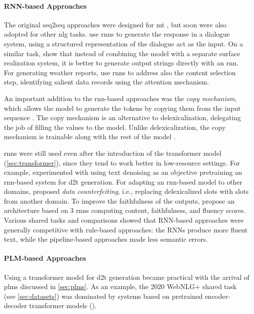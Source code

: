 {\paragraph{RNN-based Approaches} The original seq2seq approaches were designed for \ac{mt} \cite{cho2014learning,sutskever2014sequence}, but soon were also adopted for other \ac{nlg} tasks. \citet{wen2015semantically} use \acp{rnn} to generate the response in a dialogue system, using a structured representation of the dialogue act as the input. On a similar task, \citet{dusekSequencetoSequenceGenerationSpoken2016} show that instead of combining the model with a separate surface realization system, it is better to generate output strings directly with an \ac{rnn}. For generating weather reports, \citet{mei2016talk} use \acp{rnn} to address also the content selection step, identifying salient data records using the attention mechanism.

An important addition to the \ac{rnn}-based approaches was the \emph{copy mechanism}, which allows the model to generate the tokens by copying them from the input sequence \cite{gu2016incorporating,seeGetPointSummarization2017}. The copy mechanism is an alternative to delexicalization, delegating the job of filling the values to the model. Unlike delexicalization, the copy mechanism is trainable along with the rest of the model \cite{gehrmannEndtoEndContentPlan2018}.

\acp{rnn} were still used even after the introduction of the transformer model (\autoref{sec:transformer}), since they tend to work better in low-resource settings. For example, \citet{freitagUnsupervisedNaturalLanguage2018} experimented with using text denoising as an objective pretraining an \ac{rnn}-based system for \ac{d2t} generation. For adapting an \ac{rnn}-based model to other domains, \citet{wen2020recurrent} proposed \emph{data counterfeiting}, i.e., replacing delexicalized slots with slots from another domain. To improve the faithfulness of the outputs, \citet{rebuffel2021controlling} propose an architecture based on 3 \acp{rnn} computing content, faithfulness, and fluency scores. Various shared tasks and comparisons \cite{gardentWebNLGChallengeGenerating2017,dusekEvaluatingStateoftheartEndtoEnd2020,ferreiraNeuralDatatotextGeneration2019} showed that RNN-based approaches were generally competitive with rule-based approaches: the RNNs produce more fluent text, while the pipeline-based approaches made less semantic errors.


\paragraph{PLM-based Approaches} Using a transformer model for \ac{d2t} generation became practical with the arrival of \acp{plm} discussed in \autoref{sec:plms}. As an example, the 2020 WebNLG+ shared task (see \autoref{sec:datasets}) was dominated by systems based on pretrained encoder-decoder transformer models (\citealp{ferreira20202020,yang2020improving,agarwalMachineTranslationAided2020,kasnerTrainHardFinetune2020}).

}
